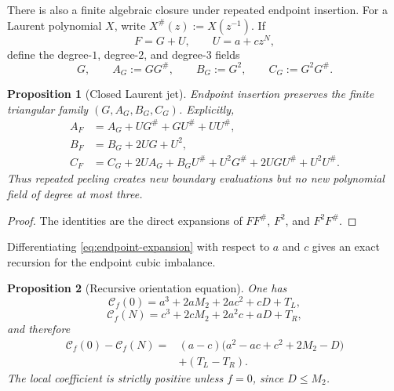 \documentclass[11pt,reqno]{amsart}
\numberwithin{equation}{section}
\newtheorem{proposition}[proposition]{Proposition}
\theoremstyle{definition}
\theoremstyle{remark}
\newcommand{\cC}{\mathcal C}
\begin{document}
There is also a finite algebraic closure under repeated endpoint insertion.
For a Laurent polynomial $X$, write $X^\#(z):=X(z^{-1})$.  If
\[
  F=G+U,
  \qquad
  U=a+cz^N,
\]
define the degree-$1$, degree-$2$, and degree-$3$ fields
\begin{equation}\label{eq:jet}
  G,
  \qquad A_G:=GG^\#,
  \qquad B_G:=G^2,
  \qquad C_G:=G^2G^\#.
\end{equation}

\begin{proposition}[Closed Laurent jet]\label{prop:closed-jet}
Endpoint insertion preserves the finite triangular family
$(G,A_G,B_G,C_G)$.  Explicitly,
\begin{align}
  A_F&=A_G+UG^\#+GU^\#+UU^\#,\label{eq:AF}\\
  B_F&=B_G+2UG+U^2,\label{eq:BF}\\
  C_F&=C_G+2UA_G+B_GU^\#+U^2G^\#
        +2UGU^\#+U^2U^\#.
        \label{eq:CF}
\end{align}
Thus repeated peeling creates new boundary evaluations but no new
polynomial field of degree at most three.
\end{proposition}

\begin{proof}
The identities are the direct expansions of $FF^\#$, $F^2$, and
$F^2F^\#$.
\end{proof}

Differentiating \eqref{eq:endpoint-expansion} with respect to $a$ and $c$
gives an exact recursion for the endpoint cubic imbalance.

\begin{proposition}[Recursive orientation equation]\label{prop:orientation-recursion}
One has
\begin{equation}\label{eq:Cf0}
  \cC_f(0)=a^3+2aM_2+2ac^2+cD+T_L,
\end{equation}
\begin{equation}\label{eq:CfN}
  \cC_f(N)=c^3+2cM_2+2a^2c+aD+T_R,
\end{equation}
and therefore
\begin{equation}\label{eq:orientation-recursion}
\begin{aligned}
  \cC_f(0)-\cC_f(N)
  ={}&(a-c)\bigl(a^2-ac+c^2+2M_2-D\bigr)\\
     &+(T_L-T_R).
\end{aligned}
\end{equation}
The local coefficient is strictly positive unless $f=0$, since
$D\le M_2$.
\end{proposition}
\end{document}
